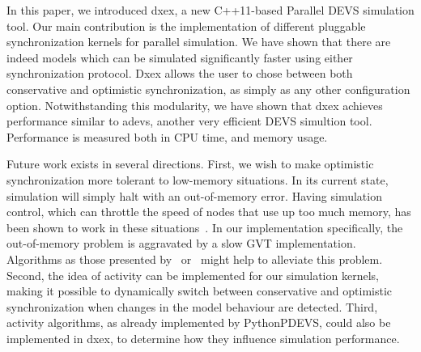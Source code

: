In this paper, we introduced dxex, a new C++11-based \textsf{Parallel DEVS} simulation tool.
Our main contribution is the implementation of different pluggable synchronization kernels for parallel simulation.
We have shown that there are indeed models which can be simulated significantly faster using either synchronization protocol.
Dxex allows the user to chose between both conservative and optimistic synchronization, as simply as any other configuration option.
Notwithstanding this modularity, we have shown that dxex achieves performance similar to adevs, another very efficient \textsf{DEVS} simultion tool.
Performance is measured both in CPU time, and memory usage.

Future work exists in several directions.
First, we wish to make optimistic synchronization more tolerant to low-memory situations.
In its current state, simulation will simply halt with an out-of-memory error.
Having simulation control, which can throttle the speed of nodes that use up too much memory, has been shown to work in these situations~\cite{FujimotoBook}.
In our implementation specifically, the out-of-memory problem is aggravated by a slow GVT implementation.
Algorithms as those presented by~\cite{Fujimoto:1997:CGV:268403.268404} or~\cite{Bauer:2005:SND:1069810.1070159} might help to alleviate this problem.
Second, the idea of activity can be implemented for our simulation kernels, making it possible to dynamically switch between conservative and optimistic synchronization when changes in the model behaviour are detected.
Third, activity algorithms, as already implemented by PythonPDEVS, could also be implemented in dxex, to determine how they influence simulation performance.
